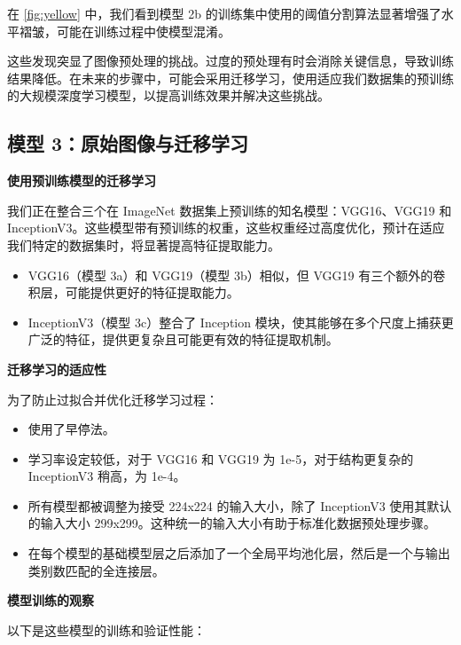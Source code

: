 在 \autoref{fig:yellow} 中，我们看到模型 2b 的训练集中使用的阈值分割算法显著增强了水平褶皱，可能在训练过程中使模型混淆。

这些发现突显了图像预处理的挑战。过度的预处理有时会消除关键信息，导致训练结果降低。在未来的步骤中，可能会采用迁移学习，使用适应我们数据集的预训练的大规模深度学习模型，以提高训练效果并解决这些挑战。

\subsection{模型 3：原始图像与迁移学习}

\textbf{使用预训练模型的迁移学习}

我们正在整合三个在 ImageNet 数据集上预训练的知名模型：VGG16、VGG19 和 InceptionV3。这些模型带有预训练的权重，这些权重经过高度优化，预计在适应我们特定的数据集时，将显著提高特征提取能力。

\begin{itemize}
    \item VGG16（模型 3a）和 VGG19（模型 3b）相似，但 VGG19 有三个额外的卷积层，可能提供更好的特征提取能力。
    \item InceptionV3（模型 3c）整合了 Inception 模块，使其能够在多个尺度上捕获更广泛的特征，提供更复杂且可能更有效的特征提取机制。
\end{itemize}

\textbf{迁移学习的适应性}

为了防止过拟合并优化迁移学习过程：

\begin{itemize}
    \item 使用了早停法。
    \item 学习率设定较低，对于 VGG16 和 VGG19 为 1e-5，对于结构更复杂的 InceptionV3 稍高，为 1e-4。
    \item 所有模型都被调整为接受 224x224 的输入大小，除了 InceptionV3 使用其默认的输入大小 299x299。这种统一的输入大小有助于标准化数据预处理步骤。
    \item 在每个模型的基础模型层之后添加了一个全局平均池化层，然后是一个与输出类别数匹配的全连接层。
\end{itemize}

\textbf{模型训练的观察}

以下是这些模型的训练和验证性能：

